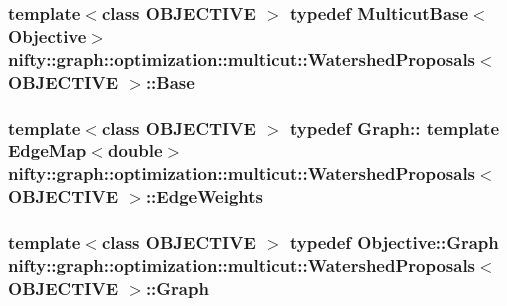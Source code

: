 \subsubsection[{Base}]{\setlength{\rightskip}{0pt plus 5cm}template$<$class O\+B\+J\+E\+C\+T\+I\+V\+E $>$ typedef {\bf Multicut\+Base}$<${\bf Objective}$>$ {\bf nifty\+::graph\+::optimization\+::multicut\+::\+Watershed\+Proposals}$<$ O\+B\+J\+E\+C\+T\+I\+V\+E $>$\+::{\bf Base}}\label{classnifty_1_1graph_1_1optimization_1_1multicut_1_1WatershedProposals_a830da5754c9f95076be49214815b3093}
\hypertarget{classnifty_1_1graph_1_1optimization_1_1multicut_1_1WatershedProposals_a8dc46879d28f37e1a8a8a79091a59e7f}{}
\subsubsection[{Edge\+Weights}]{\setlength{\rightskip}{0pt plus 5cm}template$<$class O\+B\+J\+E\+C\+T\+I\+V\+E $>$ typedef Graph\+:: template Edge\+Map$<$double$>$ {\bf nifty\+::graph\+::optimization\+::multicut\+::\+Watershed\+Proposals}$<$ O\+B\+J\+E\+C\+T\+I\+V\+E $>$\+::{\bf Edge\+Weights}}\label{classnifty_1_1graph_1_1optimization_1_1multicut_1_1WatershedProposals_a8dc46879d28f37e1a8a8a79091a59e7f}
\hypertarget{classnifty_1_1graph_1_1optimization_1_1multicut_1_1WatershedProposals_ae5682cdbd9df86644a5ff5f03149b959}{}
\subsubsection[{Graph}]{\setlength{\rightskip}{0pt plus 5cm}template$<$class O\+B\+J\+E\+C\+T\+I\+V\+E $>$ typedef Objective\+::\+Graph {\bf nifty\+::graph\+::optimization\+::multicut\+::\+Watershed\+Proposals}$<$ O\+B\+J\+E\+C\+T\+I\+V\+E $>$\+::{\bf Graph}}\label{classnifty_1_1graph_1_1optimization_1_1multicut_1_1WatershedProposals_ae5682cdbd9df86644a5ff5f03149b959}
\hypertarget{classnifty_1_1graph_1_1optimization_1_1multicut_1_1WatershedProposals_a73c2ef9e4f709718cd0ce6c6349a559b}{}
